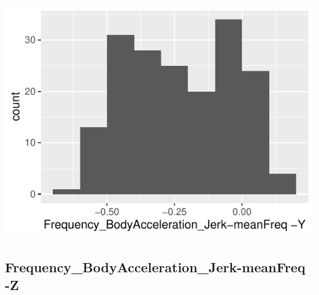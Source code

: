 \documentclass[
]{article}
\begin{document}
\begin{minipage}{0.25 \textwidth}

\includegraphics{codebook_tidydatasub_files/figure-latex/Var-59-Frequency-BodyAcceleration-Jerk-meanFreq--Y-1.pdf}

\end{minipage}

\noindent\makebox[\linewidth]{\rule{\textwidth}{0.4pt}}

\hypertarget{frequency_bodyacceleration_jerk-meanfreq--z}{%
\subsection{Frequency\_BodyAcceleration\_Jerk-meanFreq
-Z}\label{frequency_bodyacceleration_jerk-meanfreq--z}}
\end{document}
